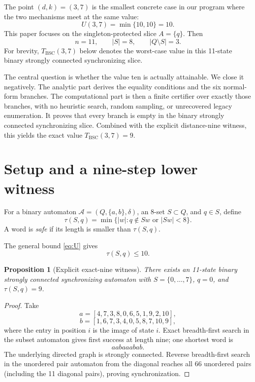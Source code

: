 \documentclass[11pt]{article}
\newtheorem{proposition}{Proposition}
\theoremstyle{definition}
\theoremstyle{remark}
\newcommand{\Acal}{\mathcal A}
\newcommand{\BSC}{\mathrm{BSC}}
\begin{document}
The point $(d,k)=(3,7)$ is the smallest concrete case in our program where the two mechanisms meet at the same value:
\[
U(3,7)=\min\{10,10\}=10.
\]
This paper focuses on the singleton-protected slice $A=\{q\}$. Then
\[
n=11,\qquad |S|=8,\qquad |Q\setminus S|=3.
\]
For brevity, $T_{\BSC}(3,7)$ below denotes the worst-case value in this 11-state binary strongly connected synchronizing slice.

The central question is whether the value ten is actually attainable. We close it negatively. The analytic part derives the equality conditions and the six normal-form branches. The computational part is then a finite certifier over exactly those branches, with no heuristic search, random sampling, or unrecovered legacy enumeration. It proves that every branch is empty in the binary strongly connected synchronizing slice. Combined with the explicit distance-nine witness, this yields the exact value $T_{\BSC}(3,7)=9$.

\section{Setup and a nine-step lower witness}
For a binary automaton $\Acal=(Q,\{a,b\},\delta)$, an 8-set $S\subset Q$, and $q\in S$, define
\[
\tau(S,q)=\min\{|w|:q\notin Sw\text{ or }|Sw|<8\}.
\]
A word is \emph{safe} if its length is smaller than $\tau(S,q)$.

The general bound \eqref{eq:U} gives
\begin{equation}\label{eq:upper10}
\tau(S,q)\le10.
\end{equation}

\begin{proposition}[Explicit exact-nine witness]\label{prop:witness}
There exists an 11-state binary strongly connected synchronizing automaton with $S=\{0,\ldots,7\}$, $q=0$, and $\tau(S,q)=9$.
\end{proposition}
\begin{proof}
Take
\[
a=[4,7,3,8,0,6,5,1,9,2,10],
\]
\[
b=[1,6,7,3,4,0,5,8,7,10,9],
\]
where the entry in position $i$ is the image of state $i$. Exact breadth-first search in the subset automaton gives first success at length nine; one shortest word is
\[
aabaaabab.
\]
The underlying directed graph is strongly connected. Reverse breadth-first search in the unordered pair automaton from the diagonal reaches all 66 unordered pairs (including the 11 diagonal pairs), proving synchronization.
\end{proof}
\end{document}

